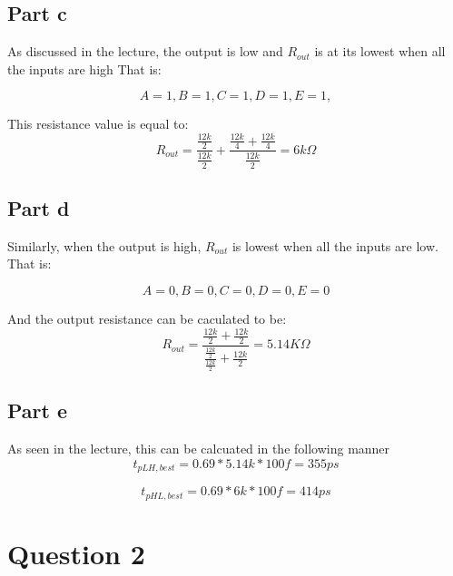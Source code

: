 \documentclass{article}
\begin{document}
\subsection*{Part c}
As discussed in the lecture, the output is low and $R_{out}$ is at its lowest when all the inputs are high
That is:

\begin{equation}
    A = 1,
    B = 1,
    C = 1,
    D = 1,
    E = 1,
\end{equation}

This resistance value is equal to:
\begin{equation}
    R_{out} = \frac{\frac{12k}{2}}{\frac{12k}{2}} + \frac{\frac{12k}{4} + \frac{12k}{4}}{\frac{12k}{2}} = 6k\Omega
\end{equation}

\subsection*{Part d}
Similarly, when the output is high, $R_{out}$ is lowest when all the inputs are low.
That is:

\begin{equation}
    A = 0, B= 0, C = 0, D = 0, E = 0
\end{equation}

And the output resistance can be caculated to be:
\begin{equation}
    R_{out} = \frac{\frac{12k}{2} + \frac{12k}{2}}{\frac{\frac{12k}{2}}{\frac{12k}{2}} + \frac{12k}{2}} = 5.14K\Omega
\end{equation}

\subsection*{Part e}
As seen in the lecture, this can be calcuated in the following manner
\begin{equation}
    t_{pLH, best} = 0.69 * 5.14k * 100f = 355 ps
\end{equation}

\begin{equation}
    t_{pHL, best} = 0.69 * 6k * 100f = 414 ps
\end{equation}

\section*{Question 2}
\end{document}
